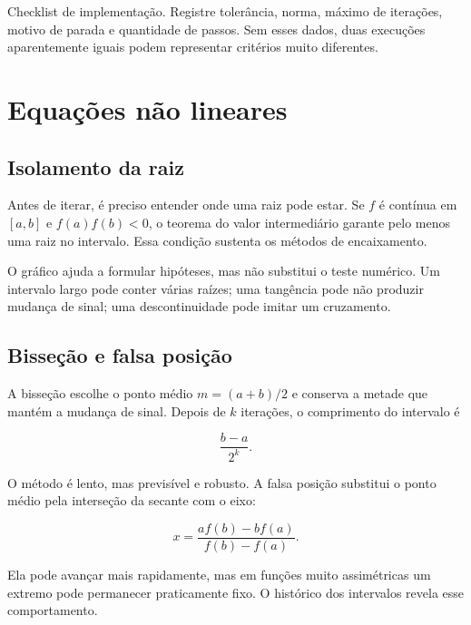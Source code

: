 \documentclass[12pt,a4paper,openany]{book}
\begin{document}
\begin{destaque}{Checklist de implementação.}
Registre tolerância, norma, máximo de iterações, motivo de parada e quantidade de passos. Sem esses dados, duas execuções aparentemente iguais podem representar critérios muito diferentes.
\end{destaque}



\chapter{Equações não lineares}



\section{Isolamento da raiz}



Antes de iterar, é preciso entender onde uma raiz pode estar. Se $f$ é contínua em $[a,b]$ e $f(a)f(b)<0$, o teorema do valor intermediário garante pelo menos uma raiz no intervalo. Essa condição sustenta os métodos de encaixamento.



O gráfico ajuda a formular hipóteses, mas não substitui o teste numérico. Um intervalo largo pode conter várias raízes; uma tangência pode não produzir mudança de sinal; uma descontinuidade pode imitar um cruzamento.



\section{Bisseção e falsa posição}



A bisseção escolhe o ponto médio $m=(a+b)/2$ e conserva a metade que mantém a mudança de sinal. Depois de $k$ iterações, o comprimento do intervalo é



\[\frac{b-a}{2^k}.\]



O método é lento, mas previsível e robusto. A falsa posição substitui o ponto médio pela interseção da secante com o eixo:



\[x=\frac{a f(b)-b f(a)}{f(b)-f(a)}.\]



Ela pode avançar mais rapidamente, mas em funções muito assimétricas um extremo pode permanecer praticamente fixo. O histórico dos intervalos revela esse comportamento.
\end{document}
